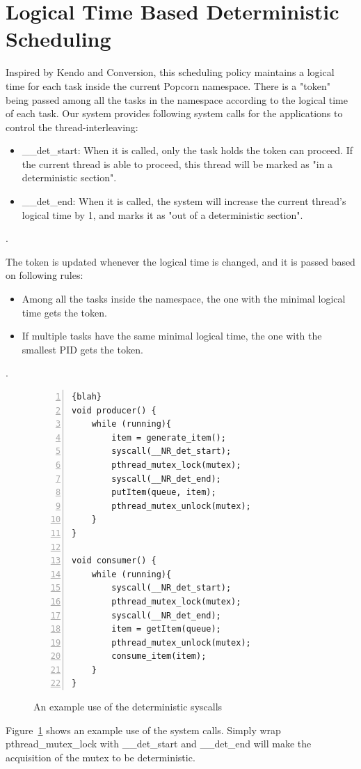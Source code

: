 \section{Logical Time Based Deterministic Scheduling} \label{sec:detsched}
Inspired by Kendo and Conversion, this scheduling policy maintains a logical time for each task inside the current Popcorn namespace. There is a "token" being passed among all the tasks in the namespace according to the logical time of each task. Our system provides following system calls for the applications to control the thread-interleaving:
\begin{itemize}
   \item \_\_det\_start: When it is called, only the task holds the token can proceed. If the current thread is able to proceed, this thread will be marked as "in a deterministic section".
   \item \_\_det\_end: When it is called, the system will increase the current thread's logical time by 1, and marks it as "out of a deterministic section".
\end{itemize}.

The token is updated whenever the logical time is changed, and it is passed based on following rules:
\begin{itemize}
   \item Among all the tasks inside the namespace, the one with the minimal logical time gets the token.
   \item If multiple tasks have the same minimal logical time, the one with the smallest PID gets the token.
\end{itemize}.

\begin{figure}
\centering
\begin{lstlisting}[numbers=left, frame=single, basicstyle=\small, breaklines]{blah}
void producer() {
    while (running){
        item = generate_item();
        syscall(__NR_det_start);
        pthread_mutex_lock(mutex);
        syscall(__NR_det_end);    
        putItem(queue, item);    
        pthread_mutex_unlock(mutex);
    }
}

void consumer() {
    while (running){
        syscall(__NR_det_start);
        pthread_mutex_lock(mutex);
        syscall(__NR_det_end);
        item = getItem(queue);    
        pthread_mutex_unlock(mutex);		
        consume_item(item);
    }
}
\end{lstlisting}
\caption{An example use of the deterministic syscalls}
\label{fig:example}
\end{figure}
Figure~\ref{fig:example} shows an example use of the system calls. Simply wrap pthread\_mutex\_lock with \_\_det\_start and \_\_det\_end will make the acquisition of the mutex to be deterministic.

